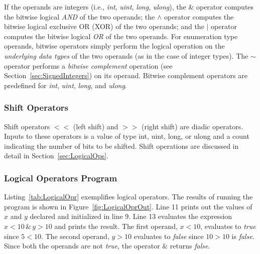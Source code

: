 If the operands are integers (i.e., \emph{int}, \emph{uint},
\emph{long}, \emph{ulong}), the \& operator computes the bitwise
logical \emph{AND} of the two operands; the $\wedge$ operator
computes the bitwise logical exclusive OR (XOR) of the two
operands; and the $\vert$ operator computes the bitwise logical
\emph{OR} of the two operands. For enumeration type operands,
bitwise operators simply perform the logical operation on the
\emph{underlying data types} of the two operands (as in the case
of integer types). The $\sim$ operator performs a \emph{bitwise
complement} operation (see Section~\ref{sec:SignedIntegers}) on
its operand. Bitwise complement operators are predefined for
\emph{int}, \emph{uint}, \emph{long}, and \emph{ulong}.



\subsubsection{Shift Operators}

Shift operators $<\!<$ (left shift) and  $>\!>$ (right shift) are
diadic operators. Inputs to these operators is a value of type
int, uint, long, or ulong and a count indicating the number of
bits to be shifted. Shift operations are discussed in detail in
Section~\ref{sec:LogicalOps}.


\subsubsection{Logical Operators Program}


Listing~\ref{tab:LogicalOpr} exemplifies logical operators. The
results of running the program is shown in
Figure~\ref{fig:LogicalOprOut}. Line 11 prints out the values of
$x$ and $y$ declared and initialized in line 9. Line 13 evaluates
the expression $x < 10 \, \& \, y > 10$ and prints the result. The
first operand, $x < 10$, evaluates to \emph{true} since $5 < 10$.
The second operand, $y > 10$ evaluates to \emph{false} since $10
> 10$ is \emph{false}. Since both the operands are not
\emph{true}, the operator $\&$ returns \emph{false}.


